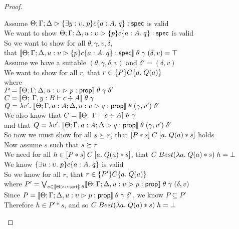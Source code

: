 \begin{proof}
  \begin{tabbedproof}
    \oo Assume $\judgeS{\spec{\exists y:\upsilon.\;p}{c}{a:A}{q}}$ is valid \\
    \ooo We want to show $\judgeS[\Theta; \Gamma; \Delta, u:\upsilon]{\spec{p}{c}{a:A}{q}}$ is valid \\
    \ooo So we want to show for all $\theta, \gamma, v, \delta$, \\
    \ooox that $\interp{\judgeS[\Theta; \Gamma; \Delta, u:\upsilon]{\spec{p}{c}{a:A}{q}}}\;\theta\;\gamma\;(\delta,v) = \top$ \\
    \ooo Assume we have a suitable $(\theta, \gamma, \delta, v)$ and $\delta' = (\delta, v)$\\ 
    \oooo We want to show for all $r$, that $r \in \spec{P}{C}{a}{Q(a)}$ \\
    \oooo where \\
    \oooox $P = \interp{\judgeA[\Theta; \Gamma; \Delta, u:\upsilon]{p}{\assert}}\;\theta\;\gamma\;\delta'$ \\
    \oooox $C = \interp{\judgeC[\Theta]{\Gamma, y:B}{c}{A}}\;\theta\;\gamma$ \\
    \oooox $Q = \semfun{v'}{\interp{\judgeA[\Theta; \Gamma, a:A; \Delta, u:\upsilon]{q}{\assert}}\;\theta\;(\gamma, v')\;\delta'}$ \\
    \oooo We also know that $C = \interp{\judgeC[\Theta]{\Gamma}{c}{A}}\;\theta\;\gamma$ \\
    \oooo and that $Q = \semfun{v'}{\interp{\judgeA[\Theta;\Gamma, a:A;\Delta]{q}{\assert}}\;\theta\;(\gamma, v')\;\delta'}$\\
    \oooo So now we must show for all $s \worldgeq r$, that $\basicspec{P * s}{C}{a}{Q(a) * s}$ holds\\
    \oooo Now assume $s$ such that $s \worldgeq r$ \\
    \ooooo We need for all $h \in \basicspec{P * s}{C}{a}{Q(a) * s}$, that 
             $C\;Best(\semfun{a}{Q(a) * s})\;h = \bot$ \\
    \ooooo We know $\spec{\exists u:\upsilon.\;p}{c}{a:A}{q}$ is valid \\
    \ooooo So we know for all $r$, that $r \in \spec{P'}{C}{a}{Q(a)}$ \\
    \oooox where $P' = \bigvee_{v \in \interp{\judgeSort{\upsilon}}\;\theta} \interp{\judgeA[\Theta; \Gamma; \Delta, u:\upsilon]{p}{\assert}}\;\theta\;\gamma\;(\delta,v)$ \\
    \ooooo Since $P = \interp{\judgeA[\Theta; \Gamma; \Delta, u:\upsilon]{p}{\assert}}\;\theta\;\gamma\;\delta'$, we know $P \subseteq P'$ \\
    \ooooo Therefore $h \in P' * s$, and so $C\;Best(\semfun{a}{Q(a) * s})\;h = \bot$ \\
    
  \end{tabbedproof}
\end{proof}

